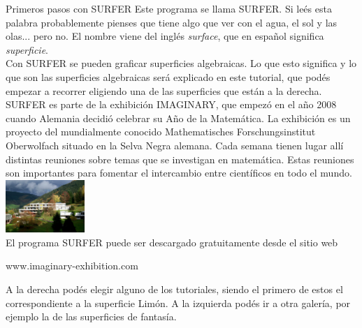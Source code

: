 \begin{surferIntroPage}{Primeros pasos con SURFER}
Este programa se llama SURFER. Si le\'es esta palabra probablemente pienses que tiene algo que ver con el agua, el sol y las olas... pero no. El nombre viene del ingl\'es {\it surface}, que en espa\~nol significa {\it superficie}.\\
Con SURFER se pueden graficar superficies algebraicas. Lo que esto significa y lo que son las superficies algebraicas ser\'a explicado en este tutorial, que pod\'es empezar a recorrer eligiendo una de las superficies que est\'an a la derecha.\\
SURFER es parte de la exhibici\'on IMAGINARY, que empez\'o en el a\~no 2008 cuando Alemania decidi\'o celebrar su A\~no de la Matem\'atica. La exhibici\'on es un proyecto del mundialmente conocido Mathematisches Forschungsinstitut Oberwolfach situado en la Selva Negra alemana. Cada semana tienen lugar all\'i distintas reuniones sobre temas que se investigan en matem\'atica. Estas reuniones son importantes para fomentar el intercambio entre cient\'ificos en todo el mundo. \\
\vspace{0.2cm} \hspace{3.5cm}\includegraphics[width=3cm]{../../common/images/photo_mfo.jpg}\\
El programa SURFER puede ser descargado gratuitamente desde el sitio web \\
\begin{centering}
www.imaginary-exhibition.com\\
\end{centering}
 \vspace{0.2cm}
A la derecha pod\'es elegir alguno de los tutoriales, siendo el primero de estos el correspondiente a la superficie Lim\'on. A la izquierda pod\'es ir a otra galer\'ia, por ejemplo la de las superficies de fantas\'ia.
\end{surferIntroPage}
